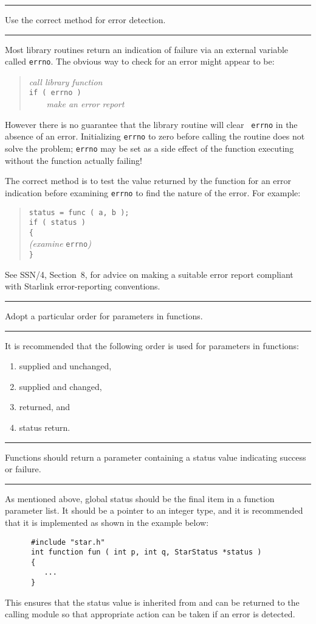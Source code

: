 \documentclass[twoside,11pt]{article}
\newcounter{sruleno}
\newcommand{\srule}[1]{
    \addtocounter{sruleno}{1}
    \goodbreak
    \rule[0.5ex]{\textwidth}{0.3mm}
    {\Large #1 \hfill {\thesruleno}}
    \rule[0.5ex]{\textwidth}{0.1mm}
}
\newcommand{\srule}[1]{
       \addtocounter{sruleno}{1}
       \begin{rawhtml} <HR> \end{rawhtml}
       {\Large \thesruleno}~~~~{\Large #1}
       \begin{rawhtml} <HR> \end{rawhtml}
       \end{tabular}
  }
\begin{document}
\srule{Use the correct method for error detection.}
Most library routines return an indication of failure via an external
variable called {\tt errno}.
The obvious way to check for an error might appear to be:
\begin{quote}
    {\sl call library function}\\
    {\tt if ( errno )}\\
    {\sl  \ \ \ \ make an error report}
\end{quote}
However there is no guarantee that the library routine will clear {\tt
errno} in the absence of an error. Initializing {\tt errno} to zero
before  calling the routine does not solve the problem;
{\tt errno} may be set as
a side effect of the function executing without the function actually failing!

The correct method is to test the value returned by the function
for an error indication
before examining {\tt errno} to find the nature of the error. For example:
\begin{quote}
      {\tt status = func ( a, b );}\\
      {\tt if ( status )}\\
      {\tt \{}\\
      {\sl (examine} {\tt errno}{\sl )}\\
      {\tt \}}
\end{quote}
See SSN/4, Section~8,  for advice on making a suitable error report
compliant with Starlink error-reporting conventions.


\srule{Adopt a particular order for parameters in functions.}
It is recommended that the following order is used for parameters in
functions:
\begin{enumerate}
\item supplied and unchanged,
\item supplied and changed,
\item returned, and
\item status return.
\end{enumerate}


\srule{Functions should return a parameter containing a status value
indicating success or failure.}
As mentioned above, global status should be the final item
in a function parameter list.
It should be a pointer to an integer type, and it is recommended that it is
implemented as shown in the example below:
\begin{verbatim}
      #include "star.h"
      int function fun ( int p, int q, StarStatus *status )
      {
         ...
      }
\end{verbatim}
This ensures that the status value is inherited from and can be
returned to the calling module so that appropriate action can be
taken if an error is detected.
\end{document}
